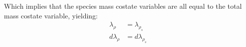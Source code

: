 Which implies that the species mass costate variables are all equal to the total mass costate variable, yielding:
\begin{align}
  \lambda_{\rho} &= \lambda_{\rho_s} \\
  d \lambda_{\rho} &= d \lambda_{\rho_s}
  \label{final_result}
\end{align}
\pagebreak
